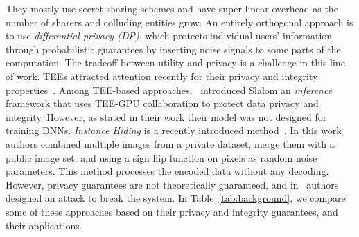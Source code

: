 They mostly use secret sharing schemes and have super-linear overhead as the number of sharers and colluding entities grow. %
An entirely orthogonal approach is to use \textit{differential privacy (DP)}, which protects individual users' information through probabilistic guarantees by inserting noise signals to some parts of the computation. The tradeoff between utility and privacy is a challenge in this line of work. %
TEEs attracted attention recently for their privacy and integrity properties~\cite{asvadishirehjini2020goat,mo2020darknetz, ng2019goten}. Among TEE-based approaches,~\cite{tramer2018slalom} introduced Slalom an \emph{inference} framework that uses TEE-GPU collaboration to protect data privacy and integrity. However, as stated in their work their model was not designed for training DNNs. \textit{Instance Hiding} is a recently introduced method~\cite{huang2020instahide}. In this work authors combined multiple images from a private dataset, merge them with a public image set, and using a sign flip function on pixels as random noise parameters. This method processes the encoded data without any decoding. However, privacy guarantees are not theoretically guaranteed, and in~\cite{carlini2020attack} authors designed an attack to break the system. In Table~\ref{tab:background}, we compare some of these approaches based on their privacy and integrity guarantees, and their applications.



